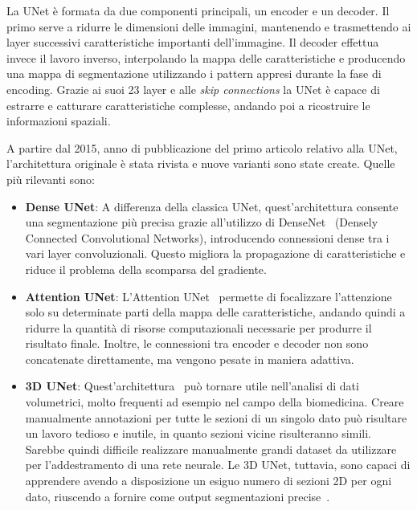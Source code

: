 \documentclass[12pt]{report}
\begin{document}
La UNet è formata da due componenti principali, un encoder e un decoder. Il primo serve a ridurre le dimensioni delle immagini, mantenendo e trasmettendo ai layer successivi caratteristiche importanti dell'immagine. Il decoder effettua invece il lavoro inverso, interpolando la mappa delle caratteristiche e producendo una mappa di segmentazione utilizzando i pattern appresi durante la fase di encoding. Grazie ai suoi 23 layer e alle \textit{skip connections} la UNet è capace di estrarre e catturare caratteristiche complesse, andando poi a ricostruire le informazioni spaziali.

A partire dal 2015, anno di pubblicazione del primo articolo relativo alla UNet, l'architettura originale è stata rivista e nuove varianti sono state create. Quelle più rilevanti sono:

\begin{itemize}
	\item \textbf{Dense UNet}: A differenza della classica UNet, quest'architettura consente una segmentazione più precisa grazie all'utilizzo di DenseNet~\cite{8296389} (Densely Connected Convolutional Networks), introducendo connessioni dense tra i vari layer convoluzionali. Questo migliora la propagazione di caratteristiche e riduce il problema della scomparsa del gradiente.
	
	\item \textbf{Attention UNet}: L'Attention UNet~\cite{oktay2018attentionunetlearninglook} permette di focalizzare l'attenzione solo su determinate parti della mappa delle caratteristiche, andando quindi a ridurre la quantità di risorse computazionali necessarie per produrre il risultato finale. Inoltre, le connessioni tra encoder e decoder non sono concatenate direttamente, ma vengono pesate in maniera adattiva.
	
	\item \textbf{3D UNet}: Quest'architettura~\cite{çiçek20163dunetlearningdense} può tornare utile nell'analisi di dati volumetrici, molto frequenti ad esempio nel campo della biomedicina. Creare manualmente annotazioni per tutte le sezioni di un singolo dato può risultare un lavoro tedioso e inutile, in quanto sezioni vicine risulteranno simili. Sarebbe quindi difficile realizzare manualmente grandi dataset da utilizzare per l'addestramento di una rete neurale. Le 3D UNet, tuttavia, sono capaci di apprendere avendo a disposizione un esiguo numero di sezioni 2D per ogni dato, riuscendo a fornire come output segmentazioni precise~\cite{çiçek20163dunetlearningdense}.
\end{itemize}
\end{document}
